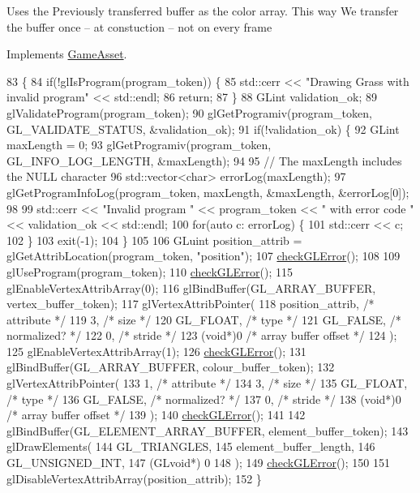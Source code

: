 Uses the Previously transferred buffer as the color array. This way We transfer the buffer once -- at constuction -- not on every frame

Implements \hyperlink{classGameAsset_a961aa51ca0a9961fc584c0b5d5431300}{Game\+Asset}.


\begin{DoxyCode}
83                                           \{
84   \textcolor{keywordflow}{if}(!glIsProgram(program\_token)) \{
85     std::cerr << \textcolor{stringliteral}{"Drawing Grass with invalid program"} << std::endl;
86     \textcolor{keywordflow}{return};
87   \}
88   GLint validation\_ok;
89   glValidateProgram(program\_token);
90   glGetProgramiv(program\_token, GL\_VALIDATE\_STATUS, &validation\_ok);
91   \textcolor{keywordflow}{if}(!validation\_ok) \{
92     GLint maxLength = 0;
93     glGetProgramiv(program\_token, GL\_INFO\_LOG\_LENGTH, &maxLength);
94 
95     \textcolor{comment}{// The maxLength includes the NULL character}
96     std::vector<char> errorLog(maxLength);
97     glGetProgramInfoLog(program\_token, maxLength, &maxLength, &errorLog[0]);
98 
99     std::cerr << \textcolor{stringliteral}{"Invalid program "} << program\_token << \textcolor{stringliteral}{" with error code "} << validation\_ok << std::endl;
100     \textcolor{keywordflow}{for}(\textcolor{keyword}{auto} c: errorLog) \{
101       std::cerr << c;
102     \}
103     exit(-1);
104   \}
105 
106   GLuint position\_attrib = glGetAttribLocation(program\_token, \textcolor{stringliteral}{"position"});
107   \hyperlink{GrassAsset_8cc_a75f201b0e53e68726854997957322b8d}{checkGLError}();
108 
109   glUseProgram(program\_token);
110   \hyperlink{GrassAsset_8cc_a75f201b0e53e68726854997957322b8d}{checkGLError}();
115   glEnableVertexAttribArray(0);
116   glBindBuffer(GL\_ARRAY\_BUFFER, vertex\_buffer\_token);
117   glVertexAttribPointer(
118     position\_attrib,        \textcolor{comment}{/* attribute */}
119     3,        \textcolor{comment}{/* size */}
120     GL\_FLOAT,   \textcolor{comment}{/* type */}
121     GL\_FALSE,   \textcolor{comment}{/* normalized? */}
122     0,        \textcolor{comment}{/* stride */}
123     (\textcolor{keywordtype}{void}*)0    \textcolor{comment}{/* array buffer offset */}
124   );
125   glEnableVertexAttribArray(1);
126   \hyperlink{GrassAsset_8cc_a75f201b0e53e68726854997957322b8d}{checkGLError}();
131   glBindBuffer(GL\_ARRAY\_BUFFER, colour\_buffer\_token);
132   glVertexAttribPointer(
133     1,        \textcolor{comment}{/* attribute */}
134     3,        \textcolor{comment}{/* size */}
135     GL\_FLOAT,   \textcolor{comment}{/* type */}
136     GL\_FALSE,   \textcolor{comment}{/* normalized? */}
137     0,        \textcolor{comment}{/* stride */}
138     (\textcolor{keywordtype}{void}*)0    \textcolor{comment}{/* array buffer offset */}
139   );
140   \hyperlink{GrassAsset_8cc_a75f201b0e53e68726854997957322b8d}{checkGLError}();
141 
142   glBindBuffer(GL\_ELEMENT\_ARRAY\_BUFFER, element\_buffer\_token);
143   glDrawElements(
144     GL\_TRIANGLES,
145     element\_buffer\_length,
146     GL\_UNSIGNED\_INT,
147     (GLvoid*) 0
148   );
149   \hyperlink{GrassAsset_8cc_a75f201b0e53e68726854997957322b8d}{checkGLError}();
150 
151   glDisableVertexAttribArray(position\_attrib);
152 \}
\end{DoxyCode}


